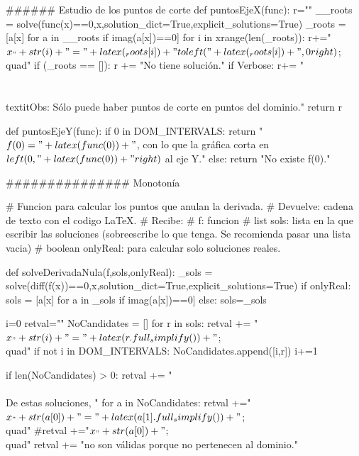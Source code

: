 \begin{sagesilent}
###### Estudio de los puntos de corte
def puntosEjeX(func):
    r=""
    __roots = solve(func(x)==0,x,solution_dict=True,explicit_solutions=True)
    _roots = [a[x] for a in __roots if imag(a[x])==0]
    for i in xrange(len(_roots)):
        r+="$x_"+str(i)+" = "+latex(_roots[i])+"\\to \\left("+latex(_roots[i])+",0\\right)$;\\quad"
    if (_roots == []):
        r += "No tiene solución."
    if Verbose:
        r+= "\\\\\\textit{Obs: Sólo puede haber puntos de corte en puntos del dominio.}"
    return r

def puntosEjeY(func):
    if 0 in DOM_INTERVALS:
        return "$f(0) = " + latex(func(0)) + "$, con lo que la gráfica corta en $\\left(0,"+latex(func(0)) + "\\right)$ al eje Y."   
    else:
        return  "No existe f(0)."    
    


############### Monotonía

# Funcion para calcular los puntos que anulan la derivada.
# Devuelve: cadena de texto con el codigo LaTeX.
# Recibe:
#   f: funcion
#   list sols: lista en la que escribir las soluciones (sobreescribe lo que tenga. Se recomienda pasar una lista vacia) 
#   boolean onlyReal: para calcular solo soluciones reales.

def solveDerivadaNula(f,sols,onlyReal):
    _sols = solve(diff(f(x))==0,x,solution_dict=True,explicit_solutions=True)
    if onlyReal:
        sols = [a[x] for a in _sols if imag(a[x])==0]
    else: 
        sols=_sols




    i=0
    retval=""
    NoCandidates = []
    for r in sols:
        retval += "$x_"+str(i)+" = "+latex(r.full_simplify())+"$;\\quad"
        if not i in DOM_INTERVALS:
            NoCandidates.append([i,r])
        i+=1
    
    if len(NoCandidates) > 0:
        retval += "\\\\De estas soluciones, "
        for a in NoCandidates:
            retval +="$x_"+str(a[0])+"="+latex(a[1].full_simplify())+" $;\\quad"
            #retval +="$x_"+str(a[0])+" $;\\quad"
        retval += "no son válidas porque no pertenecen al dominio."
    


\end{sagesilent}
